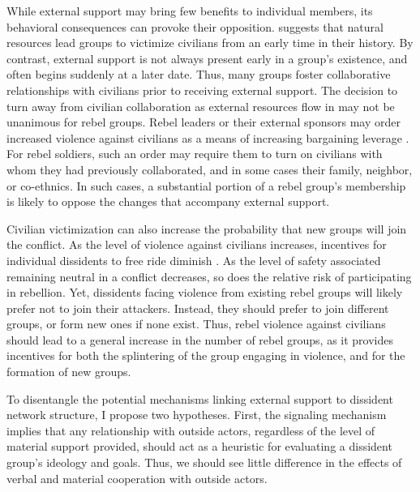 While external support may bring few benefits to individual members, its behavioral consequences can provoke their opposition. \citet{Weinstein2007} suggests that natural resources lead groups to victimize civilians from an early time in their history. By contrast, external support is not always present early in a group's existence, and often begins suddenly at a later date. Thus, many groups foster collaborative relationships with civilians prior to receiving external support. The decision to turn away from civilian collaboration as external resources flow in may not be unanimous for rebel groups. Rebel leaders or their external sponsors may order increased violence against civilians as a means of increasing bargaining leverage \citep{Downes2006}. For rebel soldiers, such an order may require them to turn on civilians with whom they had previously collaborated, and in some cases their family, neighbor, or co-ethnics. In such cases, a substantial portion of a rebel group's membership is likely to oppose the changes that accompany external support.

Civilian victimization can also increase the probability that new groups will join the conflict. As the level of violence against civilians increases, incentives for individual dissidents to free ride diminish \citep{Kalyvas2014}. As the level of safety associated remaining neutral in a conflict decreases, so does the relative risk of participating in rebellion. Yet, dissidents facing violence from existing rebel groups will likely prefer not to join their attackers. Instead, they should prefer to join different groups, or form new ones if none exist. Thus, rebel violence against civilians should lead to a general increase in the number of rebel groups, as it provides incentives for both the splintering of the group engaging in violence, and for the formation of new groups.

To disentangle the potential mechanisms linking external support to dissident network structure, I propose two hypotheses. First, the signaling mechanism implies that any relationship with outside actors, regardless of the level of material support provided, should act as a heuristic for evaluating a dissident group's ideology and goals. Thus, we should see little difference in the effects of verbal and material cooperation with outside actors.


